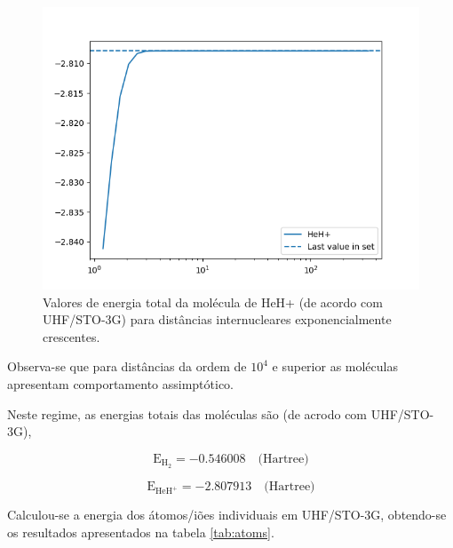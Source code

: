 \documentclass[portuguese,]{article}
\begin{document}
\begin{figure}
\centering
\includegraphics{bits/figures/HeH+.png}
\caption{Valores de energia total da molécula de HeH+ (de acordo com
UHF/STO-3G) para distâncias internucleares exponencialmente crescentes.
\label{fig:HeHassimp}}
\end{figure}

Observa-se que para distâncias da ordem de \(10^4\) e superior as
moléculas apresentam comportamento assimptótico.

Neste regime, as energias totais das moléculas são (de acrodo com
UHF/STO-3G),

\[ \text{E}_{\text{H}_2}    = -0.546008 \quad \text{(Hartree)} \]

\[ \text{E}_{\text{HeH}^+}  = -2.807913 \quad \text{(Hartree)} \]

Calculou-se a energia dos átomos/iões individuais em UHF/STO-3G,
obtendo-se os resultados apresentados na tabela \ref{tab:atoms}.
\end{document}
